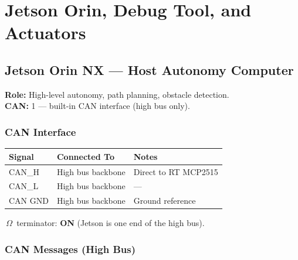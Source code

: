 \documentclass[12pt,a4paper,oneside]{report}
\begin{document}

\chapter{Jetson Orin, Debug Tool, and Actuators}

\section{Jetson Orin NX --- Host Autonomy Computer}

\textbf{Role:} High-level autonomy, path planning, obstacle detection.\\
\textbf{CAN:} 1 --- built-in CAN interface (high bus only).

\subsection{CAN Interface}

\begin{center}
\begin{tabular}{lll}
\toprule
\textbf{Signal} & \textbf{Connected To} & \textbf{Notes} \\
\midrule
CAN\_H  & High bus backbone & Direct to RT MCP2515 \\
CAN\_L  & High bus backbone & --- \\
CAN GND & High bus backbone & Ground reference \\
\bottomrule
\end{tabular}
\end{center}

\,$\Omega$\ terminator: \textbf{ON} (Jetson is one end of the high bus).

\subsection{CAN Messages (High Bus)}
\end{document}
